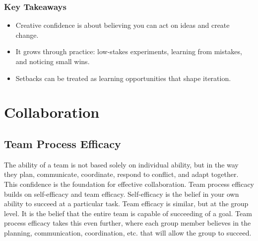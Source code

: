 \documentclass{report}
\begin{document}
		\subsection{Key Takeaways}

			\begin{itemize}
				\item Creative confidence is about believing you can act on ideas and create change.
				\item It grows through practice: low-stakes experiments, learning from mistakes, and noticing small wins.
				\item Setbacks can be treated as learning opportunities that shape iteration.
			\end{itemize}

\chapter{Collaboration}

	\section{Team Process Efficacy}

		The ability of a team is not based solely on individual ability, but in the way they plan, communicate, coordinate, respond to conflict, and adapt together. This confidence is the foundation for effective collaboration. Team process efficacy builds on self-efficacy and team efficacy. Self-efficacy is the belief in your own ability to succeed at a particular task. Team efficacy is similar, but at the group level. It is the belief that the entire team is capable of succeeding of a goal. Team process efficacy takes this even further, where each group member believes in the planning, communication, coordination, etc. that will allow the group to succeed.
\end{document}
